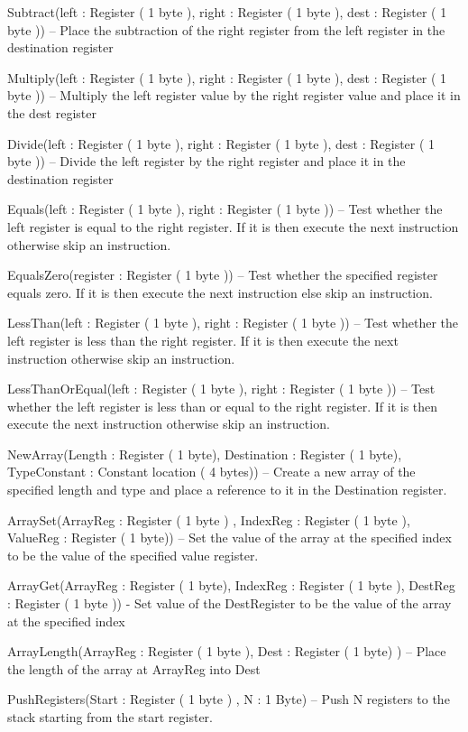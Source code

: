 \documentclass[]{final_report}
\begin{document}
Subtract(left : Register ( 1 byte ), right : Register ( 1 byte ), dest : Register ( 1 byte )) – Place the
subtraction of the right register from the left register in the destination register

Multiply(left : Register ( 1 byte ), right : Register ( 1 byte ), dest : Register ( 1 byte )) – Multiply
the left register value by the right register value and place it in the dest register

Divide(left : Register ( 1 byte ), right : Register ( 1 byte ), dest : Register ( 1 byte )) – Divide the
left register by the right register and place it in the destination register

Equals(left : Register ( 1 byte ), right : Register ( 1 byte )) – Test whether the left register is equal
to the right register. If it is then execute the next instruction otherwise skip an instruction.

EqualsZero(register : Register ( 1 byte )) – Test whether the specified register equals zero. If it is
then execute the next instruction else skip an instruction.

LessThan(left : Register ( 1 byte ), right : Register ( 1 byte )) – Test whether the left register is less
than the right register. If it is then execute the next instruction otherwise skip an instruction.

LessThanOrEqual(left : Register ( 1 byte ), right : Register ( 1 byte )) – Test whether the left
register is less than or equal to the right register. If it is then execute the next instruction otherwise
skip an instruction.

NewArray(Length : Register ( 1 byte), Destination : Register ( 1 byte), TypeConstant : Constant
location ( 4 bytes)) – Create a new array of the specified length and type and place a reference to it
in the Destination register.

ArraySet(ArrayReg : Register ( 1 byte ) , IndexReg : Register ( 1 byte ), ValueReg : Register ( 1
byte)) – Set the value of the array at the specified index to be the value of the specified value
register.

ArrayGet(ArrayReg : Register ( 1 byte), IndexReg : Register ( 1 byte ), DestReg : Register ( 1
byte )) - Set value of the DestRegister to be the value of the array at the specified index

ArrayLength(ArrayReg : Register ( 1 byte ), Dest : Register ( 1 byte) ) – Place the length of the
array at ArrayReg into Dest

PushRegisters(Start : Register ( 1 byte ) , N : 1 Byte) – Push N registers to the stack starting from
the start register.
\end{document}
